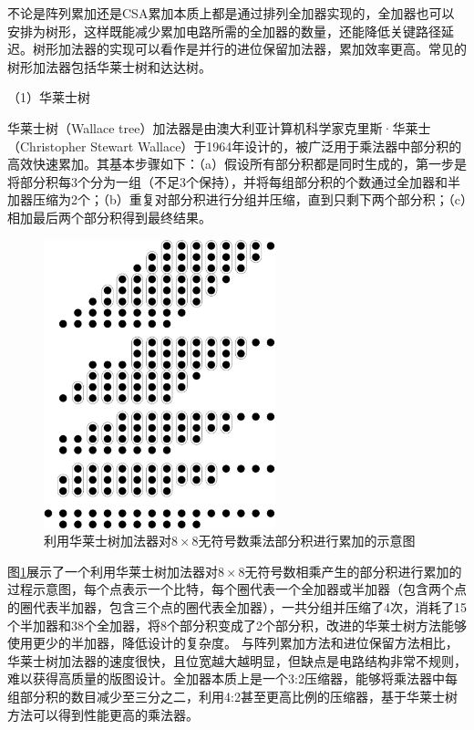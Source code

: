 不论是阵列累加还是CSA累加本质上都是通过排列全加器实现的，全加器也可以安排为树形，这样既能减少累加电路所需的全加器的数量，还能降低关键路径延迟。树形加法器的实现可以看作是并行的进位保留加法器，累加效率更高。常见的树形加法器包括华莱士树\cite{EM:Wallace}和达达树\cite{EM:Dadda}。

（1）华莱士树 \label{华莱士树}

华莱士树（Wallace tree）加法器\cite{EM:Wallace}是由澳大利亚计算机科学家克里斯·华莱士（Christopher Stewart Wallace）于1964年设计的，被广泛用于乘法器中部分积的高效快速累加。其基本步骤如下：（a）假设所有部分积都是同时生成的，第一步是将部分积每3个分为一组（不足3个保持），并将每组部分积的个数通过全加器和半加器压缩为2个；（b）重复对部分积进行分组并压缩，直到只剩下两个部分积；（c）相加最后两个部分积得到最终结果。
\begin{figure}[!htb]
    \centering
    \includegraphics[width=0.6\textwidth]{figs/EM-wallace.pdf}
    \caption{利用华莱士树加法器对$8 \times 8$无符号数乘法部分积进行累加的示意图}
    \label{EM:Fig:wallace}
\end{figure}
图\ref{EM:Fig:wallace}展示了一个利用华莱士树加法器对$8 \times 8$无符号数相乘产生的部分积进行累加的过程示意图，每个点表示一个比特，每个圈代表一个全加器或半加器（包含两个点的圈代表半加器，包含三个点的圈代表全加器），一共分组并压缩了4次，消耗了15个半加器和38个全加器，将8个部分积变成了2个部分积，改进的华莱士树方法能够使用更少的半加器，降低设计的复杂度\cite{EM:redeuce_wallace}。
与阵列累加方法和进位保留方法相比，华莱士树加法器的速度很快，且位宽越大越明显，但缺点是电路结构非常不规则，难以获得高质量的版图设计。全加器本质上是一个3:2压缩器，能够将乘法器中每组部分积的数目减少至三分之二，利用4:2甚至更高比例的压缩器，基于华莱士树方法可以得到性能更高的乘法器\cite{EM:wallace_42}。

